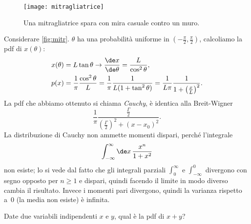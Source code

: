 \begin{figure}
	\centering
	\texttt{[image: mitragliatrice]} 
	\caption{\label{fig:mitr} Una mitragliatrice spara con mira casuale contro un muro.}
\end{figure}

\begin{example}
	Considerare \autoref{fig:mitr}.
	$\theta$ ha una probabilità uniforme in $\left(-\frac\pi2,\frac\pi2\right)$, calcoliamo la pdf di $x(\theta)$:
	\begin{align*}
		x(\theta) &= L \tan\theta \rightarrow \frac{\de x}{\de\theta} = \frac L {\cos^2\theta}, \\
		p(x) &= \frac1\pi \frac{\cos^2\theta} L = \frac1\pi\frac1{L(1+\tan^2\theta)} = \frac1{L\pi}\frac1{1+\left(\frac xL\right)^2}.
	\end{align*}
	La pdf che abbiamo ottenuto si chiama \emph{Cauchy}, è identica alla Breit-Wigner
	\begin{equation*}
		\frac1\pi \frac {\frac\Gamma2} {\left(\frac\Gamma2\right)^2 + (x-x_0)^2}.
	\end{equation*}
	La distribuzione di Cauchy non ammette momenti dispari, perché l'integrale
	\begin{equation*}
		\int_{-\infty}^\infty \de x\,\frac {x^n} {1+x^2}
	\end{equation*}
	non esiste; lo si vede dal fatto che gli integrali parziali $\int_{0}^\infty$ e $\int_{-\infty}^{0}$ divergono con segno opposto per $n \ge 1$ e dispari, quindi facendo il limite in modo diverso cambia il risultato.
	Invece i momenti pari divergono, quindi la varianza rispetto a~0 (la media non esiste) è infinita.
\end{example}

\begin{exercise}
	Date due variabili indipendenti $x$ e $y$, qual è la pdf di $x+y$?
\end{exercise}

